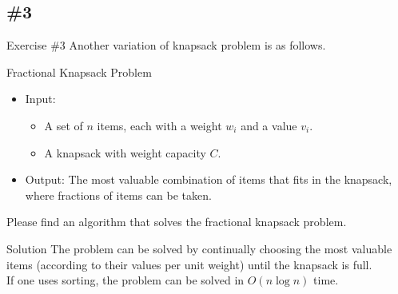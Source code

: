 \documentclass{beamer}
\begin{document}
\subsection{\#3}
\begin{frame}{Exercise \#3}
  Another variation of knapsack problem is as follows. \pause
  \begin{block}{Fractional Knapsack Problem}
    \begin{itemize}
      \item Input:
      \begin{itemize}
        \item A set of $n$ items, each with a weight $w_i$ and a value $v_i$.
        \item A knapsack with weight capacity $C$.
      \end{itemize}
      \item Output: The most valuable combination of items that fits in the
      knapsack, where fractions of items can be taken.
    \end{itemize}
    \pause
  \end{block}
  Please find an algorithm that solves the fractional knapsack problem. \pause
  \begin{block}{Solution}
    The problem can be solved by continually choosing the most valuable items
    (according to their values per unit weight) until the knapsack is full. \\
    If one uses sorting, the problem can be solved in $O(n \log n)$ time.
  \end{block}
\end{frame}
\end{document}
